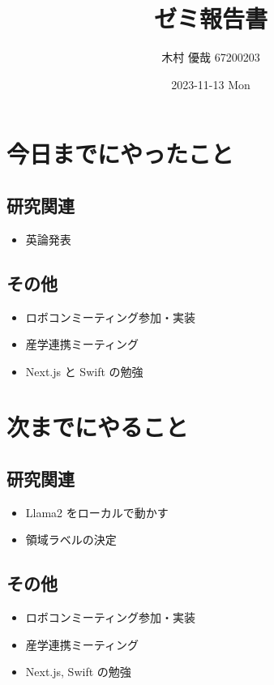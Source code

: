 \documentclass[uplatex, onecolumn, 10pt]{jsarticle}
\begin{document}
\title{\vspace{-40mm}\bf{\LARGE{ゼミ報告書}}}
\author{\vspace{-40mm}木村 優哉 67200203}
\date{2023-11-13 Mon}
\maketitle


\section{今日までにやったこと}

\subsection*{研究関連}
\begin{itemize}
	\item 英論発表
\end{itemize}

\subsection*{その他}
\begin{itemize}
	\item ロボコンミーティング参加・実装
	\item 産学連携ミーティング
	\item Next.js と Swift の勉強
\end{itemize}


\section{次までにやること}

\subsection*{研究関連}
\begin{itemize}
	\item Llama2 をローカルで動かす
	\item 領域ラベルの決定
\end{itemize}

\subsection*{その他}
\begin{itemize}
	\item ロボコンミーティング参加・実装
	\item 産学連携ミーティング
	\item Next.js, Swift の勉強
\end{itemize}
\end{document}
